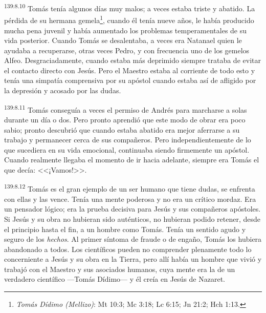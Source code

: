 \par 
\textsuperscript{139:8.10} Tomás tenía algunos días muy malos; a veces estaba triste y abatido. La pérdida de su hermana gemela\footnote{\textit{Tomás Dídimo (Mellizo)}: Mt 10:3; Mc 3:18; Lc 6:15; Jn 21:2; Hch 1:13.}, cuando él tenía nueve años, le había producido mucha pena juvenil y había aumentado los problemas temperamentales de su vida posterior. Cuando Tomás se desalentaba, a veces era Natanael quien le ayudaba a recuperarse, otras veces Pedro, y con frecuencia uno de los gemelos Alfeo. Desgraciadamente, cuando estaba más deprimido siempre trataba de evitar el contacto directo con Jesús. Pero el Maestro estaba al corriente de todo esto y tenía una simpatía comprensiva por su apóstol cuando estaba así de afligido por la depresión y acosado por las dudas.

\par 
\textsuperscript{139:8.11} Tomás conseguía a veces el permiso de Andrés para marcharse a solas durante un día o dos. Pero pronto aprendió que este modo de obrar era poco sabio; pronto descubrió que cuando estaba abatido era mejor aferrarse a su trabajo y permanecer cerca de sus compañeros. Pero independientemente de lo que sucediera en su vida emocional, continuaba siendo firmemente un apóstol. Cuando realmente llegaba el momento de ir hacia adelante, siempre era Tomás el que decía: <<¡Vamos!>>.

\par 
\textsuperscript{139:8.12} Tomás es el gran ejemplo de un ser humano que tiene dudas, se enfrenta con ellas y las vence. Tenía una mente poderosa y no era un crítico mordaz. Era un pensador lógico; era la prueba decisiva para Jesús y sus compañeros apóstoles. Si Jesús y su obra no hubieran sido auténticos, no hubieran podido retener, desde el principio hasta el fin, a un hombre como Tomás. Tenía un sentido agudo y seguro de los \textit{hechos}. Al primer síntoma de fraude o de engaño, Tomás los hubiera abandonado a todos. Los científicos pueden no comprender plenamente todo lo concerniente a Jesús y su obra en la Tierra, pero allí había un hombre que vivió y trabajó con el Maestro y sus asociados humanos, cuya mente era la de un verdadero científico ---Tomás Dídimo--- y él creía en Jesús de Nazaret.

